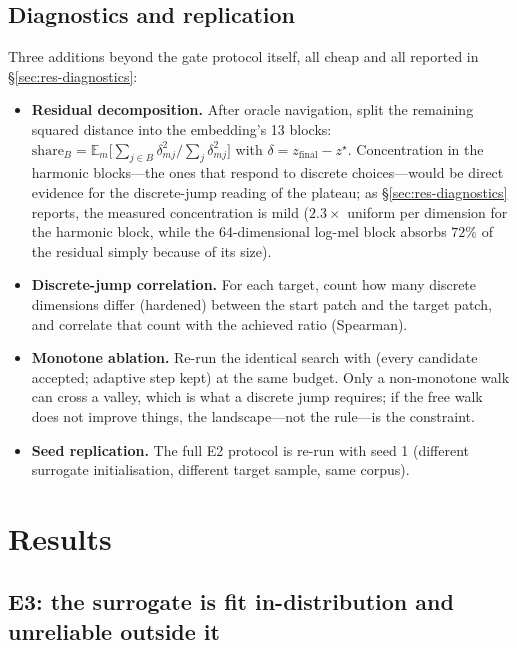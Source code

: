 \documentclass[11pt]{article}
\newcommand{\code}[1]{\texttt{\detokenize{#1}}}
\begin{document}
\subsection{Diagnostics and replication}\label{sec:diagprotocol}

Three additions beyond the gate protocol itself, all cheap and all reported in
\S\ref{sec:res-diagnostics}:

\begin{itemize}
\item \textbf{Residual decomposition.} After oracle navigation, split the
  remaining squared distance into the embedding's 13 blocks:
  $\mathrm{share}_B = \mathbb{E}_m\big[\sum_{j\in B}\delta_{mj}^2 /
  \sum_j \delta_{mj}^2\big]$ with $\delta = z_{\text{final}} - z^\star$.  Concentration in the
harmonic blocks---the ones that respond to discrete
  choices---would be direct evidence for the discrete-jump reading of the
  plateau; as \S\ref{sec:res-diagnostics} reports, the measured concentration
  is mild ($2.3\times$ uniform per dimension for the harmonic block, while the
  64-dimensional log-mel block absorbs $72\%$ of the residual simply because of
  its size).
\item \textbf{Discrete-jump correlation.} For each target, count how many
  discrete dimensions differ (hardened) between the start patch and the target
  patch, and correlate that count with the achieved ratio (Spearman).
\item \textbf{Monotone ablation.} Re-run the identical search with
  \code{monotone=False} (every candidate accepted; adaptive step kept) at the
  same budget. Only a non-monotone walk can cross a valley, which is what a
  discrete jump requires; if the free walk does not improve things, the
  landscape---not the rule---is the constraint.
\item \textbf{Seed replication.} The full E2 protocol is re-run with seed 1
  (different surrogate initialisation, different target sample, same corpus).
\end{itemize}

\section{Results}\label{sec:results}

\subsection{E3: the surrogate is fit in-distribution and unreliable outside it}
\end{document}
